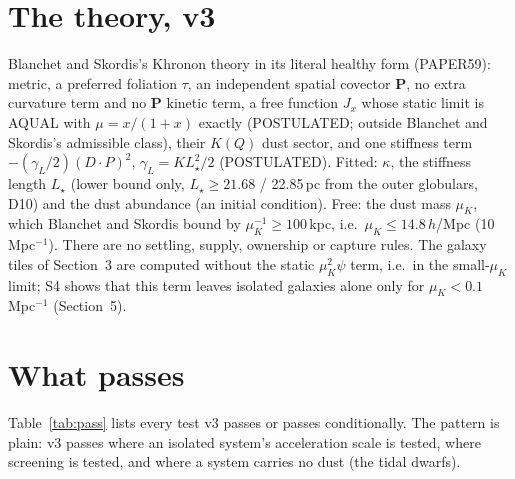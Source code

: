 \documentclass[10pt]{article}
\begin{document}
\section{The theory, v3}
Blanchet and Skordis's Khronon theory in its literal healthy form (PAPER59): metric, a preferred foliation $\tau$, an independent spatial covector $\mathbf P$, no extra curvature term and no $\mathbf P$ kinetic term, a free function $J_x$ whose static limit is AQUAL with $\mu=x/(1+x)$ exactly (POSTULATED; outside Blanchet and Skordis's admissible class), their $K(Q)$ dust sector, and one stiffness term $-(\gamma_L/2)(D\cdot P)^2$, $\gamma_L=KL_\star^2/2$ (POSTULATED). Fitted: $\kappa$, the stiffness length $L_\star$ (lower bound only, $L_\star\ge21.68$ / 22.85\,pc from the outer globulars, D10) and the dust abundance (an initial condition). Free: the dust mass $\mu_K$, which Blanchet and Skordis bound by $\mu_K^{-1}\ge100$\,kpc, i.e.\ $\mu_K\le14.8\,h$/Mpc (10\,Mpc$^{-1}$). There are no settling, supply, ownership or capture rules. The galaxy tiles of Section~3 are computed without the static $\mu_K^2\psi$ term, i.e.\ in the small-$\mu_K$ limit; S4 shows that this term leaves isolated galaxies alone only for $\mu_K<0.1$\,Mpc$^{-1}$ (Section~5).

\section{What passes}
Table~\ref{tab:pass} lists every test v3 passes or passes conditionally. The pattern is plain: v3 passes where an isolated system's acceleration scale is tested, where screening is tested, and where a system carries no dust (the tidal dwarfs).
\end{document}
